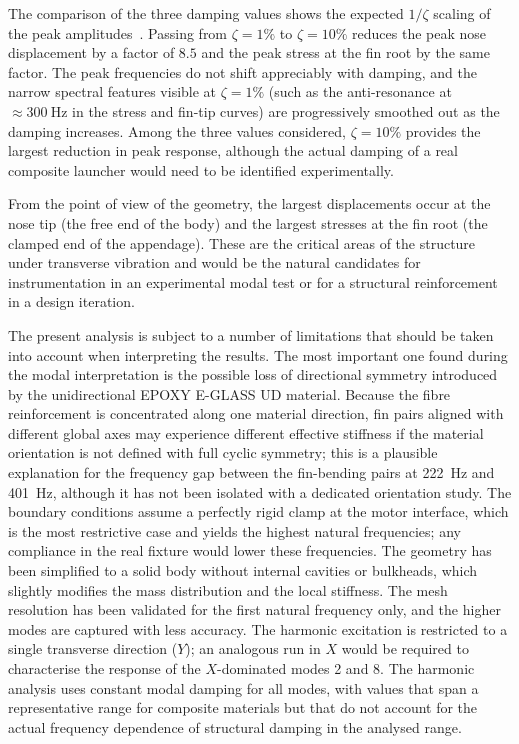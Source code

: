 The comparison of the three damping values shows the expected $1/\zeta$ scaling of the peak amplitudes~\cite{inman_engineering_vibration}. Passing from $\zeta = 1\%$ to $\zeta = 10\%$ reduces the peak nose displacement by a factor of $8.5$ and the peak stress at the fin root by the same factor. The peak frequencies do not shift appreciably with damping, and the narrow spectral features visible at $\zeta = 1\%$ (such as the anti-resonance at $\approx \SI{300}{\hertz}$ in the stress and fin-tip curves) are progressively smoothed out as the damping increases. Among the three values considered, $\zeta = 10\%$ provides the largest reduction in peak response, although the actual damping of a real composite launcher would need to be identified experimentally.

From the point of view of the geometry, the largest displacements occur at the nose tip (the free end of the body) and the largest stresses at the fin root (the clamped end of the appendage). These are the critical areas of the structure under transverse vibration and would be the natural candidates for instrumentation in an experimental modal test or for a structural reinforcement in a design iteration.

The present analysis is subject to a number of limitations that should be taken into account when interpreting the results. The most important one found during the modal interpretation is the possible loss of directional symmetry introduced by the unidirectional EPOXY E-GLASS UD material. Because the fibre reinforcement is concentrated along one material direction, fin pairs aligned with different global axes may experience different effective stiffness if the material orientation is not defined with full cyclic symmetry; this is a plausible explanation for the frequency gap between the fin-bending pairs at \SI{222}{\hertz} and \SI{401}{\hertz}, although it has not been isolated with a dedicated orientation study. The boundary conditions assume a perfectly rigid clamp at the motor interface, which is the most restrictive case and yields the highest natural frequencies; any compliance in the real fixture would lower these frequencies. The geometry has been simplified to a solid body without internal cavities or bulkheads, which slightly modifies the mass distribution and the local stiffness. The mesh resolution has been validated for the first natural frequency only, and the higher modes are captured with less accuracy. The harmonic excitation is restricted to a single transverse direction ($Y$); an analogous run in $X$ would be required to characterise the response of the $X$-dominated modes 2 and 8. The harmonic analysis uses constant modal damping for all modes, with values that span a representative range for composite materials but that do not account for the actual frequency dependence of structural damping in the analysed range.
